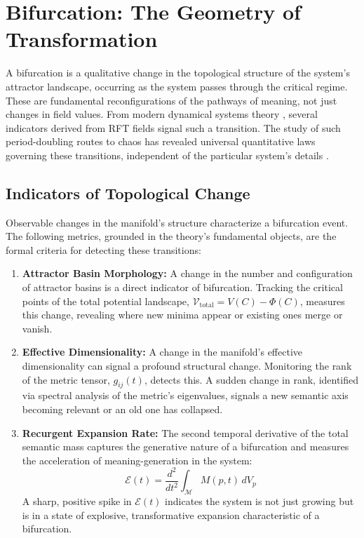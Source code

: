 \section{Bifurcation: The Geometry of Transformation}

A bifurcation is a qualitative change in the topological structure of the system's attractor landscape, occurring as the system passes through the critical regime. These are fundamental reconfigurations of the pathways of meaning, not just changes in field values. From modern dynamical systems theory \autocite{Poincare1892, Lorenz1963, Smale1967, RuelleTakens1971, GuckenheimerHolmes1983, Kuznetsov2004, Strogatz2014}, several indicators derived from RFT fields signal such a transition. The study of such period-doubling routes to chaos has revealed universal quantitative laws governing these transitions, independent of the particular system's details \autocite{Feigenbaum1978}.

\subsection{Indicators of Topological Change}

Observable changes in the manifold's structure characterize a bifurcation event. The following metrics, grounded in the theory's fundamental objects, are the formal criteria for detecting these transitions:
\begin{enumerate}
    \item \textbf{Attractor Basin Morphology:} A change in the number and configuration of attractor basins is a direct indicator of bifurcation. Tracking the critical points of the total potential landscape, \(\mathcal{V}_{\text{total}} = V(C) - \Phi(C)\), measures this change, revealing where new minima appear or existing ones merge or vanish.
    \item \textbf{Effective Dimensionality:} A change in the manifold's effective dimensionality can signal a profound structural change. Monitoring the rank of the metric tensor, \(g_{ij}(t)\), detects this. A sudden change in rank, identified via spectral analysis of the metric's eigenvalues, signals a new semantic axis becoming relevant or an old one has collapsed.
    \item \textbf{Recurgent Expansion Rate:} The second temporal derivative of the total semantic mass captures the generative nature of a bifurcation and measures the acceleration of meaning-generation in the system:
    \begin{equation}
    \mathcal{E}(t) = \frac{d^2}{dt^2}\int_{\mathcal{M}} M(p,t) \, dV_p
    \end{equation}
    A sharp, positive spike in \(\mathcal{E}(t)\) indicates the system is not just growing but is in a state of explosive, transformative expansion characteristic of a bifurcation.
\end{enumerate}

